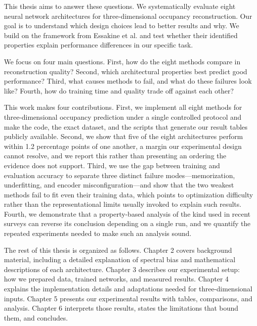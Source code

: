 This thesis aims to answer these questions. We systematically evaluate eight neural network architectures for three-dimensional occupancy reconstruction. Our goal is to understand which design choices lead to better results and why. We build on the framework from Essakine et al. and test whether their identified properties explain performance differences in our specific task.

We focus on four main questions. First, how do the eight methods compare in reconstruction quality? Second, which architectural properties best predict good performance? Third, what causes methods to fail, and what do these failures look like? Fourth, how do training time and quality trade off against each other?

This work makes four contributions. First, we implement all eight methods for three-dimensional occupancy prediction under a single controlled protocol and make the code, the exact dataset, and the scripts that generate our result tables publicly available. Second, we show that five of the eight architectures perform within 1.2 percentage points of one another, a margin our experimental design cannot resolve, and we report this rather than presenting an ordering the evidence does not support. Third, we use the gap between training and evaluation accuracy to separate three distinct failure modes---memorization, underfitting, and encoder misconfiguration---and show that the two weakest methods fail to fit even their training data, which points to optimization difficulty rather than the representational limits usually invoked to explain such results. Fourth, we demonstrate that a property-based analysis of the kind used in recent surveys can reverse its conclusion depending on a single run, and we quantify the repeated experiments needed to make such an analysis sound.

The rest of this thesis is organized as follows. Chapter 2 covers background material, including a detailed explanation of spectral bias and mathematical descriptions of each architecture. Chapter 3 describes our experimental setup: how we prepared data, trained networks, and measured results. Chapter 4 explains the implementation details and adaptations needed for three-dimensional inputs. Chapter 5 presents our experimental results with tables, comparisons, and analysis. Chapter 6 interprets those results, states the limitations that bound them, and concludes.
